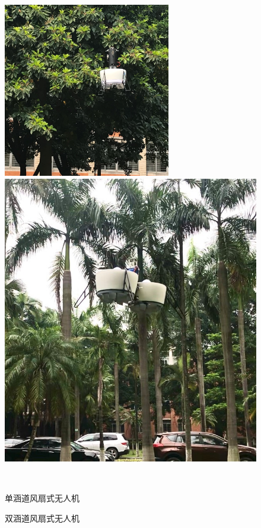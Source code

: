 \begin{figure}[htbp]
	\centering
	\begin{minipage}[c]{0.5\textwidth}
		\centering
		\includegraphics[scale=1]{Fig/DFUAV_f31.png}
	\end{minipage}%
	\begin{minipage}[c]{0.5\textwidth}
		\centering
		\includegraphics[scale=0.41]{Fig/TwinductedfanUAV.jpg}
	\end{minipage}\\[1pt]
	\begin{minipage}[t]{.5\textwidth}
		\caption{\label{DFUAV}单涵道风扇式无人机}
	\end{minipage}%
	\begin{minipage}[t]{.5\textwidth}
		\caption{\label{TDFUAV}双涵道风扇式无人机}
	\end{minipage}%
\end{figure}
